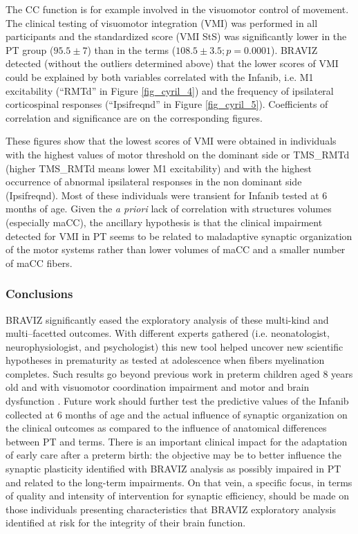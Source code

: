 \documentclass{frontiersHLTH}
\begin{document}


The CC function is for example involved in the visuomotor control of movement. The clinical testing of visuomotor integration (VMI) was performed in all participants and the standardized score (VMI StS) was significantly lower in the PT group ($95.5 \pm 7$) than in the terms ($108.5 \pm 3.5 ; p=0.0001$). 
BRAVIZ detected (without the outliers determined above) that the lower scores of VMI could be explained by both variables correlated with the Infanib, i.e. M1 excitability (``RMTd'' in Figure \ref{fig_cyril_4}) and the frequency of ipsilateral corticospinal responses (``Ipsifreqnd'' in Figure \ref{fig_cyril_5}). Coefficients of correlation and significance are on the corresponding figures.

These figures show that the lowest scores of VMI were obtained in individuals with the highest values of motor threshold on the dominant side or TMS\_RMTd (higher TMS\_RMTd means lower M1 excitability) and with the highest occurrence of abnormal ipsilateral responses in the non dominant side (Ipsifreqnd). Most of these individuals were transient for Infanib tested at 6 months of age. Given the \emph{a priori} lack of correlation with structures volumes (especially maCC), the ancillary hypothesis is that the clinical impairment detected for VMI in PT seems to be related to maladaptive synaptic organization of the motor systems rather than lower volumes of maCC and a smaller number of maCC fibers.

\subsubsection{Conclusions}

BRAVIZ significantly eased the exploratory analysis of these multi-kind and multi–facetted outcomes. With different experts gathered (i.e. neonatologist, neurophysiologist, and psychologist) this new tool helped uncover new scientific hypotheses in prematurity as tested at adolescence when fibers myelination completes. Such results go beyond previous work in preterm children aged 8 years old and with visuomotor coordination impairment and motor and brain dysfunction \cite{schneider_visuo-motor_2008,flamand_brain_2012}. Future work should further test the predictive values of the Infanib collected at 6 months of age and the actual influence of synaptic organization on the clinical outcomes as compared to the influence of anatomical differences between PT and terms. There is an important clinical impact for the adaptation of early care after a preterm birth: the objective may be to better influence the synaptic plasticity identified with BRAVIZ analysis as possibly impaired in PT and related to the long-term impairments. On that vein, a specific focus, in terms of quality and intensity of intervention for synaptic efficiency, should be made on those individuals presenting characteristics that BRAVIZ exploratory analysis identified at risk for the integrity of their brain function.
\end{document}
